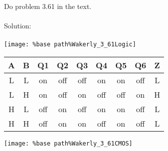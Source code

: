 Do problem 3.61 in the text.\\ \\

Solution: \\ \\
\texttt{[image: \%base path\%Wakerly\_3\_61Logic]}
\medskip
\begin{tabular}{ccccccccc}
  \textbf{A} & \textbf{B} & \textbf{Q1} & \textbf{Q2} & \textbf{Q3} & \textbf{Q4} & \textbf{Q5} & \textbf{Q6} & \textbf{Z} \\
  \hline
  L & L & on & off & off & on & on & off & L\\
  L & H & on & off & on & off & off & on & H\\
  H & L & off & on & off & on & on & off & L\\
  H & H & off & on & on & off & on & off & L\\
\end{tabular}
\medskip
\texttt{[image: \%base path\%Wakerly\_3\_61CMOS]}
